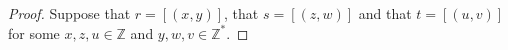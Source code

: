 \begin{proof}
	Suppose that $r = [(x, y)]$, that $s = [(z, w)]$ and that $t = [(u, v)]$ for some $x, z, u \in \mathbb{Z}$ and $y, w, v \in \mathbb{Z}^{*}$.






\end{proof}
